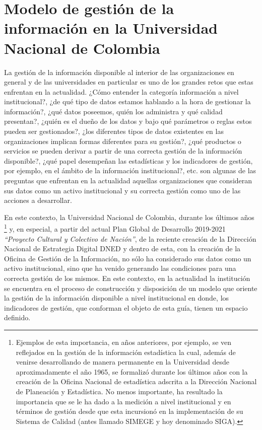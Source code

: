 \documentclass[
]{book}
\begin{document}
\hypertarget{modelo-de-gestiuxf3n-de-la-informaciuxf3n-en-la-universidad-nacional-de-colombia}{%
\chapter{Modelo de gestión de la información en la Universidad Nacional de Colombia}\label{modelo-de-gestiuxf3n-de-la-informaciuxf3n-en-la-universidad-nacional-de-colombia}}

La gestión de la información disponible al interior de las organizaciones en general y de las universidades en particular es uno de los grandes retos que estas enfrentan en la actualidad. ¿Cómo entender la categoría información a nivel institucional?, ¿de qué tipo de datos estamos hablando a la hora de gestionar la información?, ¿qué datos poseemos, quién los administra y qué calidad presentan?, ¿quién es el dueño de los datos y bajo qué parámetros o reglas estos pueden ser gestionados?, ¿los diferentes tipos de datos existentes en las organizaciones implican formas diferentes para su gestión?, ¿qué productos o servicios se pueden derivar a partir de una correcta gestión de la información disponible?, ¿qué papel desempeñan las estadísticas y los indicadores de gestión, por ejemplo, en el ámbito de la información institucional?, etc. son algunas de las preguntas que enfrentan en la actualidad aquellas organizaciones que consideran sus datos como un activo institucional y su correcta gestión como uno de las acciones a desarrollar.

En este contexto, la Universidad Nacional de Colombia, durante los últimos años \footnote{Ejemplos de esta importancia, en años anteriores, por ejemplo, se ven reflejados en la gestión de la información estadística la cual, además de venirse desarrollando de manera permanente en la Universidad desde aproximadamente el año 1965, se formalizó durante los últimos años con la creación de la Oficina Nacional de estadística adscrita a la Dirección Nacional de Planeación y Estadística. No menos importante, ha resultado la importancia que se le ha dado a la medición a nivel institucional y en términos de gestión desde que esta incursionó en la implementación de su Sistema de Calidad (antes llamado SIMEGE y hoy denominado SIGA).} y, en especial, a partir del actual Plan Global de Desarrollo 2019-2021 \emph{``Proyecto Cultural y Colectivo de Nación''}, de la reciente creación de la Dirección Nacional de Estrategia Digital DNED y dentro de esta, con la creación de la Oficina de Gestión de la Información, no sólo ha considerado sus datos como un activo institucional, sino que ha venido generando las condiciones para una correcta gestión de los mismos. En este contexto, en la actualidad la institución se encuentra en el proceso de construcción y disposición de un modelo que oriente la gestión de la información disponible a nivel institucional en donde, los indicadores de gestión, que conforman el objeto de esta guía, tienen un espacio definido.
\end{document}
